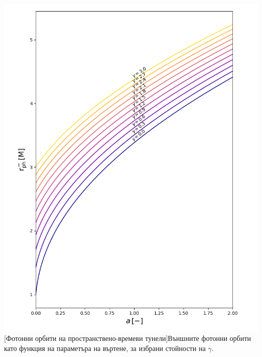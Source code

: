 	\begin{minipage}{14em}
		\hspace{-0.5cm}
		\includegraphics[scale = 0.3]{WH_rph.png}
		[Фотонни орбити на пространствено-времеви тунели]{\small Външните фотонни орбити като функция на параметъра на въртене, за избрани стойности на $\gamma$.}
		\label{WH_rph}
	\end{minipage}\,\,\,
